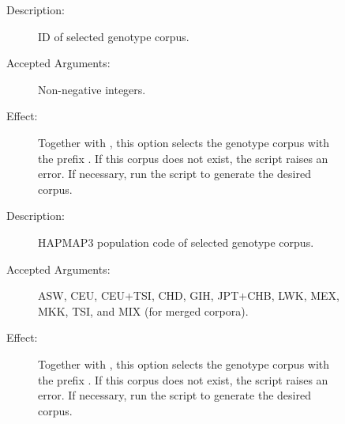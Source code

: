 \documentclass[a4paper,10pt,english]{sphinxhowto}
\begin{document}
\begin{sphinxVerbatim}[commandchars=\\\{\}]
  \PYG{p}{[} \PYG{p}{]} \PYG{p}{[} \PYG{p}{]}
\end{sphinxVerbatim}
\begin{description}
\item[{}] \leavevmode\begin{description}
\item[{}] \leavevmode\begin{description}
\item[{Description:}] \leavevmode
ID of selected genotype corpus.

\item[{Accepted Arguments:}] \leavevmode
Non-negative integers.

\item[{Effect:}] \leavevmode
Together with , this option selects the genotype corpus with the prefix .
If this corpus does not exist, the script raises an error. If necessary, run the script 
to generate the desired corpus.

\end{description}

\item[{}] \leavevmode\begin{description}
\item[{Description:}] \leavevmode
HAPMAP3 population code of selected genotype corpus.

\item[{Accepted Arguments:}] \leavevmode
ASW, CEU, CEU+TSI, CHD, GIH, JPT+CHB, LWK, MEX, MKK, TSI, and MIX (for merged corpora).

\item[{Effect:}] \leavevmode
Together with , this option selects the genotype corpus with the prefix .
If this corpus does not exist, the script raises an error. If necessary, run the script 
to generate the desired corpus.


\end{description}
\end{description}
\end{description}
\end{document}
